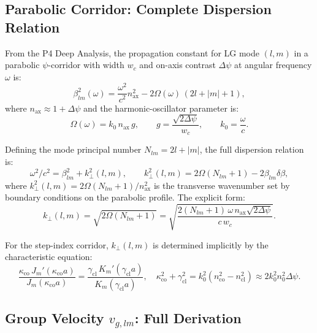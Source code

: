 \documentclass[aps,prd,twocolumn,superscriptaddress]{revtex4-2}
\begin{document}
\subsection{Parabolic Corridor: Complete Dispersion Relation}

From the P4 Deep Analysis, the propagation constant for LG mode $(l,m)$
in a parabolic $\psi$-corridor with width $w_c$ and on-axis contrast
$\Delta\psi$ at angular frequency $\omega$ is:
\begin{equation}
\beta_{lm}^2(\omega) = \frac{\omega^2}{c^2}n_\mathrm{ax}^2
  - 2\Omega(\omega)\,(2l + |m| + 1),
\label{eq:beta_sq}
\end{equation}
where $n_\mathrm{ax} \approx 1 + \Delta\psi$ and the harmonic-oscillator
parameter is:
\begin{equation}
\Omega(\omega) = k_0\,n_\mathrm{ax}\,g,
\qquad g = \frac{\sqrt{2\Delta\psi}}{w_c},
\qquad k_0 = \frac{\omega}{c}.
\label{eq:Omega}
\end{equation}

Defining the mode principal number $N_{lm} = 2l + |m|$, the full
dispersion relation is:
\begin{equation}
\boxed{
\omega^2/c^2 = \beta_{lm}^2 + k_\perp^2(l,m),
\qquad k_\perp^2(l,m) = 2\Omega(N_{lm}+1) - 2\beta_{lm}\delta\beta,
}
\label{eq:dispersion_full}
\end{equation}
where $k_\perp^2(l,m) = 2\Omega(N_{lm}+1)/n_\mathrm{ax}^2$
is the transverse wavenumber set by boundary conditions on the
parabolic profile.  The explicit form:
\begin{equation}
\boxed{
k_\perp(l,m) = \sqrt{2\Omega(N_{lm}+1)}
= \sqrt{\frac{2(N_{lm}+1)\,\omega\,n_\mathrm{ax}\sqrt{2\Delta\psi}}{c\,w_c}}.
}
\label{eq:kperp}
\end{equation}

For the step-index corridor, $k_\perp(l,m)$ is determined implicitly
by the characteristic equation:
\begin{equation}
\frac{\kappa_\mathrm{co}\,J_m'(\kappa_\mathrm{co} a)}{J_m(\kappa_\mathrm{co} a)}
= \frac{\gamma_\mathrm{cl}\,K_m'(\gamma_\mathrm{cl} a)}{K_m(\gamma_\mathrm{cl} a)},
\quad \kappa_\mathrm{co}^2 + \gamma_\mathrm{cl}^2 = k_0^2(n_\mathrm{co}^2 - n_\mathrm{cl}^2)
\approx 2k_0^2 n_0^2\Delta\psi.
\label{eq:step_char}
\end{equation}

\subsection{Group Velocity $v_{g,lm}$: Full Derivation}
\end{document}
